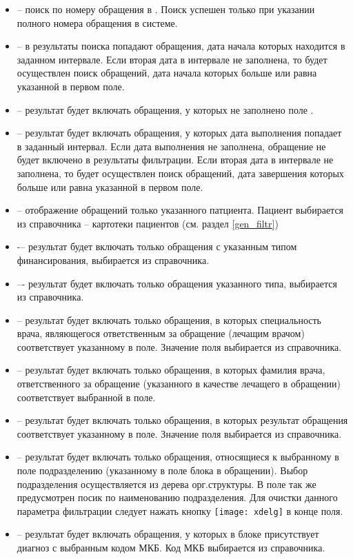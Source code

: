 \begin{itemize}
 \item {} -- поиск по номеру обращения в \tmis. Поиск успешен только при указании полного номера обращения в системе.
 \item {} -- в результаты поиска попадают обращения, дата начала которых находится в заданном интервале. Если вторая дата в интервале не заполнена, то будет осуществлен поиск обращений, дата начала которых больше или равна указанной в первом поле.
 \item {} -- результат будет включать обращения, у которых не заполнено поле .
 \item {} -- результат будет включать обращения, у которых дата выполнения попадает в заданный интервал. Если дата выполнения не заполнена, обращение не будет включено в результаты фильтрации. Если вторая дата в интервале не заполнена, то будет осуществлен поиск обращений, дата завершения которых больше или равна указанной в первом поле.
 \item {} -- отображение обращений только указанного патциента. Пациент выбирается из справочника -- картотеки пациентов (см. раздел \ref{gen_filtr})
 \item {} -– результат будет включать только обращения с указанным типом финансирования, выбирается из справочника.
 \item {} –- результат будет включать только обращения указанного типа, выбирается из справочника.
 \item {} -- результат будет включать только обращения, в которых специальность врача, являющегося ответственным за обращение (лечащим врачом) соответствует указанному в поле. Значение поля выбирается из справочника.
 \item {} -- результат будет включать только обращения, в которых фамилия врача, ответственного за обращение (указанного в качестве лечащего в обращении) соответствует выбранной в поле.
 \item {} -- результат будет включать только обращения, в которых результат обращения соответствует указанному в поле. Значение поля выбирается из справочника.
 \item {} -- результат будет включать только обращения, относящиеся к выбранному в поле подразделению (указанному в поле  блока  в обращении). Выбор подразделения осуществляется из дерева орг.структуры. В поле так же предусмотрен посик по наименованию подразделения. Для очистки данного параметра фильтрации следует нажать кнопку  \texttt{[image: xdelg]} в конце поля.
 \item {} -- результат будет включать обращения, у которых в блоке  присутствует диагноз с выбранным кодом МКБ. Код МКБ выбирается из справочника.  
\end{itemize}

